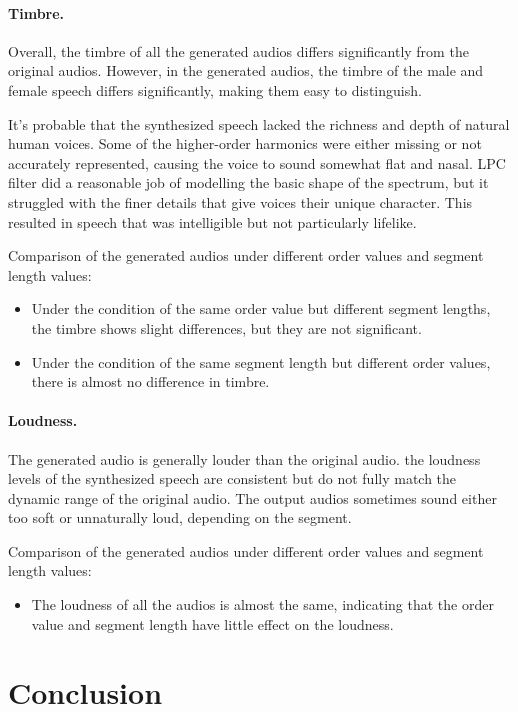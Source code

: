 \documentclass{article}
\begin{document}
\paragraph{Timbre.}
Overall, the timbre of all the generated audios differs significantly from the original audios. However, in the generated audios, the timbre of the male and female speech differs significantly, making them easy to distinguish.

It's probable that the synthesized speech lacked the richness and depth of natural human voices. Some of the higher-order harmonics were either missing or not accurately represented, causing the voice to sound somewhat flat and nasal. LPC filter did a reasonable job of modelling the basic shape of the spectrum, but it struggled with the finer details that give voices their unique character. This resulted in speech that was intelligible but not particularly lifelike.

Comparison of the generated audios under different order values and segment length values:
\begin{itemize}
  \item Under the condition of the same order value but different segment lengths, the timbre shows slight differences, but they are not significant.
  \item Under the condition of the same segment length but different order values, there is almost no difference in timbre.
\end{itemize}

\paragraph{Loudness.}
The generated audio is generally louder than the original audio. the loudness levels of the synthesized speech are consistent but do not fully match the dynamic range of the original audio. The output audios sometimes sound either too soft or unnaturally loud, depending on the segment.

Comparison of the generated audios under different order values and segment length values:
\begin{itemize}
  \item The loudness of all the audios is almost the same, indicating that the order value and segment length have little effect on the loudness.
\end{itemize}

\section{Conclusion}
\end{document}
